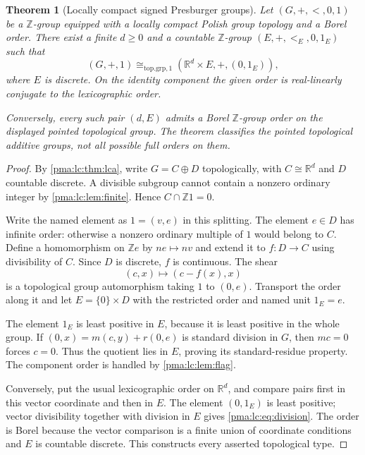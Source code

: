 \documentclass[11pt]{article}
\numberwithin{equation}{section}
\newtheorem{theorem}{Theorem}[section]
\theoremstyle{definition}
\theoremstyle{remark}
\newcommand{\Z}{\mathbb Z}
\newcommand{\R}{\mathbb R}
\begin{document}
\begin{theorem}[Locally compact signed Presburger groups]
\label{pma:lc:thm:classification}
Let $(G,+,<,0,1)$ be a $\Z$-group equipped with a locally compact Polish
group topology and a Borel order. There exist a finite $d\ge0$ and a
countable $\Z$-group $(E,+,<_{E},0,1_E)$ such that
\begin{equation}\label{pma:lc:eq:pointedsplit}
 (G,+,1)\cong_{\mathrm{top.grp},1}
 (\R^d\times E,+,(0,1_E)),
\end{equation}
where $E$ is discrete. On the identity component the given order is
real-linearly conjugate to the lexicographic order.

Conversely, every such pair $(d,E)$ admits a Borel $\Z$-group order on
the displayed pointed topological group. The theorem classifies the
pointed topological additive groups, not all possible full orders on them.
\end{theorem}
\begin{proof}
By \cref{pma:lc:thm:lca}, write $G=C\oplus D$ topologically, with
$C\cong\R^d$ and $D$ countable discrete. A divisible subgroup cannot
contain a nonzero ordinary integer by \cref{pma:lc:lem:finite}. Hence
$C\cap\Z1=0$.

Write the named element as $1=(v,e)$ in this splitting. The element
$e\in D$ has infinite order: otherwise a nonzero ordinary multiple of
$1$ would belong to $C$. Define a homomorphism on $\Z e$ by
$ne\mapsto nv$ and extend it to $f:D\to C$ using divisibility of $C$.
Since $D$ is discrete, $f$ is continuous. The shear
\[
 (c,x)\longmapsto(c-f(x),x)
\]
is a topological group automorphism taking $1$ to $(0,e)$.
Transport the order along it and let $E=\{0\}\times D$ with the
restricted order and named unit $1_E=e$.

The element $1_E$ is least positive in $E$, because it is least positive
in the whole group. If $(0,x)=m(c,y)+r(0,e)$ is standard division in
$G$, then $mc=0$ forces $c=0$. Thus the quotient lies in $E$, proving
its standard-residue property. The component order is handled by
\cref{pma:lc:lem:flag}.

Conversely, put the usual lexicographic order on $\R^d$, and compare
pairs first in this vector coordinate and then in $E$. The element
$(0,1_E)$ is least positive; vector divisibility together with division
in $E$ gives \eqref{pma:lc:eq:division}. The order is Borel because the vector
comparison is a finite union of coordinate conditions and $E$ is
countable discrete. This constructs every asserted topological type.
\end{proof}
\end{document}
